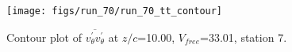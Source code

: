 \begin{figure}[H]
\centering
\texttt{[image: figs/run\_70/run\_70\_tt\_contour]}
\caption{Contour plot of $\overline{v_{\theta}^{\prime} v_{\theta}^{\prime}}$ at $z/c$=10.00, $V_{free}$=33.01, station 7.}
\label{fig:run_70_tt_contour}
\end{figure}


